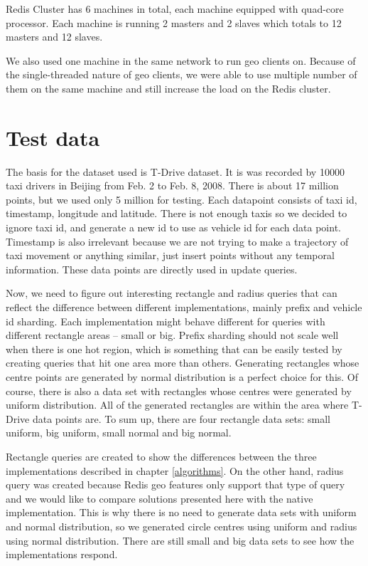 \documentclass[times, utf8, diplomski]{fer}
\begin{document}
Redis Cluster has 6 machines in total, each machine equipped with quad-core processor. Each machine is running 2 masters and 2 slaves which totals to 12 masters and 12 slaves. 

We also used one machine in the same network to run geo clients on. Because of the single-threaded nature of geo clients, we were able to use multiple number of them on the same machine and still increase the load on the Redis cluster.

\section {Test data} \label{test}
The basis for the dataset used is T-Drive \cite{tdrive1, tdrive2} dataset. It is was recorded by 10000 taxi drivers in Beijing from Feb. 2 to Feb. 8, 2008. There is about 17 million points, but we used only 5 million for testing. Each datapoint consists of taxi id, timestamp, longitude and latitude. There is not enough taxis so we decided to ignore taxi id, and generate a new id to use as vehicle id for each data point. Timestamp is also irrelevant because we are not trying to make a trajectory of taxi movement or anything similar, just insert points without any temporal information. These data points are directly used in update queries.

Now, we need to figure out interesting rectangle and radius queries that can reflect the difference between different implementations, mainly prefix and vehicle id sharding. Each implementation might behave different for queries with different rectangle areas -- small or big. Prefix sharding should not scale well when there is one hot region, which is something that can be easily tested by creating queries that hit one area more than others. Generating rectangles whose centre points are generated by normal distribution is a perfect choice for this. Of course, there is also a data set with rectangles whose centres were generated by uniform distribution. All of the generated rectangles are within the area where T-Drive data points are. To sum up, there are four rectangle data sets: small uniform, big uniform, small normal and big normal.

Rectangle queries are created to show the differences between the three implementations described in chapter \ref{algorithms}. On the other hand, radius query was created because Redis geo features only support that type of query and we would like to compare solutions presented here with the native implementation. This is why there is no need to generate data sets with uniform and normal distribution, so we generated circle centres using uniform and radius using normal distribution. There are still small and big data sets to see how the implementations respond.
\end{document}
